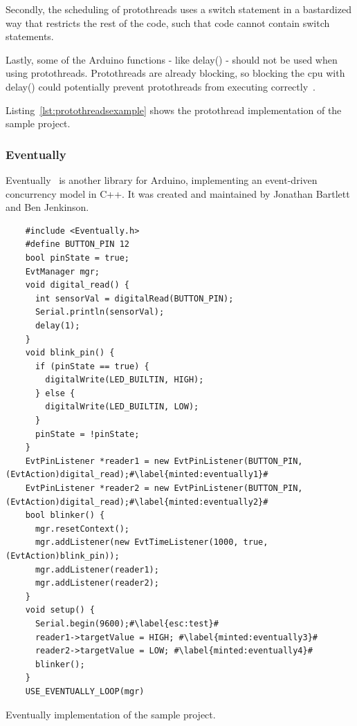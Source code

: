 Secondly, the scheduling of protothreads uses a switch statement in a bastardized way that restricts the rest of the code, such that code cannot contain switch statements.

Lastly, some of the Arduino functions - like delay() - should not be used when using protothreads. Protothreads are already blocking, so blocking the \gls{cpu} with delay() could potentially prevent protothreads from executing correctly~\cite{AdamDunkelProtothreads}.

Listing~\ref{lst:protothreadsexample} shows the protothread implementation of the sample project.


\subsubsection{Eventually}
Eventually~\cite{bartlettEventually2022Bartlett} is another library for Arduino, implementing an event-driven concurrency model in C++. It was created and maintained by Jonathan Bartlett and Ben Jenkinson.


\begin{listing}[htb!]
  \begin{verbatim}
    #include <Eventually.h>
    #define BUTTON_PIN 12
    bool pinState = true;
    EvtManager mgr;
    void digital_read() {
      int sensorVal = digitalRead(BUTTON_PIN);
      Serial.println(sensorVal);
      delay(1);
    }
    void blink_pin() {
      if (pinState == true) {
        digitalWrite(LED_BUILTIN, HIGH);
      } else {
        digitalWrite(LED_BUILTIN, LOW);
      }
      pinState = !pinState;
    }
    EvtPinListener *reader1 = new EvtPinListener(BUTTON_PIN, (EvtAction)digital_read);#\label{minted:eventually1}#
    EvtPinListener *reader2 = new EvtPinListener(BUTTON_PIN, (EvtAction)digital_read);#\label{minted:eventually2}#
    bool blinker() {
      mgr.resetContext();
      mgr.addListener(new EvtTimeListener(1000, true, (EvtAction)blink_pin));
      mgr.addListener(reader1);
      mgr.addListener(reader2);
    }
    void setup() {
      Serial.begin(9600);#\label{esc:test}#
      reader1->targetValue = HIGH; #\label{minted:eventually3}#
      reader2->targetValue = LOW; #\label{minted:eventually4}#
      blinker();
    }
    USE_EVENTUALLY_LOOP(mgr)
  \end{verbatim}
  \caption{Eventually implementation of the sample project.}
  \label{lst:eventuallyexample}
\end{listing}


